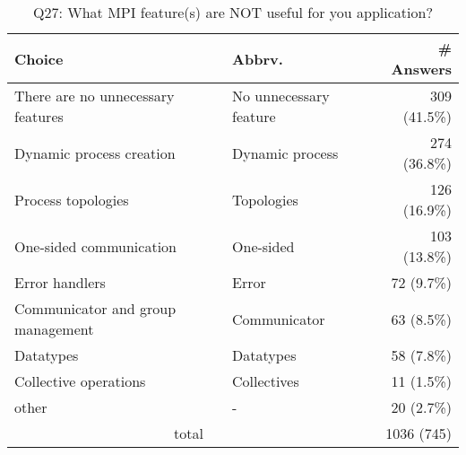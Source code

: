 \begin{table}[htb]%
\begin{center}%
\caption{Q27: What MPI feature(s) are NOT useful for you application?}%
\label{tab:Q27-ans}%
\begin{tabular}{l|l|r}%
\hline%
Choice & Abbrv. & \# Answers \\%
\hline%
There are no unnecessary features & No unnecessary feature & 309 (41.5\%) \\%
Dynamic process creation & Dynamic process & 274 (36.8\%) \\%
Process topologies & Topologies & 126 (16.9\%) \\%
One-sided communication & One-sided & 103 (13.8\%) \\%
Error handlers & Error & 72 (9.7\%) \\%
Communicator and group management & Communicator & 63 (8.5\%) \\%
Datatypes & Datatypes & 58 (7.8\%) \\%
Collective operations & Collectives & 11 (1.5\%) \\%
other & - & 20 (2.7\%) \\%
\hline%
\multicolumn{2}{c}{total} & 1036 (745)\\%
\hline%
\end{tabular}%
\end{center}%
\end{table}%
